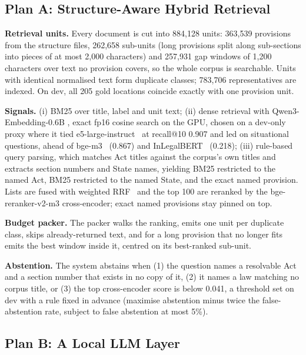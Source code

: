 \documentclass[conference]{IEEEtran}
\begin{document}
\subsection{Plan A: Structure-Aware Hybrid Retrieval}

\textbf{Retrieval units.} Every document is cut into 884,128 units: 363,539 provisions from the structure files,
262,658 sub-units (long provisions split along sub-sections into pieces of at most 2,000 characters) and 257,931
gap windows of 1,200 characters over text no provision covers, so the whole corpus is searchable. Units with
identical normalised text form duplicate classes; 783,706 representatives are indexed. On dev, all 205 gold
locations coincide exactly with one provision unit.

\textbf{Signals.} (i) BM25 over title, label and unit text; (ii) dense retrieval with Qwen3-Embedding-0.6B
\cite{zhang2025qwen3emb}, exact fp16 cosine search on the GPU, chosen on a dev-only proxy where it tied
e5-large-instruct~\cite{wang2024e5} at recall@10 0.907 and led on situational questions, ahead of
bge-m3~\cite{chen2024bgem3} (0.867) and InLegalBERT~\cite{paul2023inlegalbert} (0.218); (iii) rule-based query
parsing, which matches Act titles against the corpus's own titles and extracts section numbers and State names,
yielding BM25 restricted to the named Act, BM25 restricted to the named State, and the exact named provision.
Lists are fused with weighted RRF~\cite{cormack2009rrf} and the top 100 are reranked by the bge-reranker-v2-m3
cross-encoder; exact named provisions stay pinned on top.

\textbf{Budget packer.} The packer walks the ranking, emits one unit per duplicate class, skips already-returned
text, and for a long provision that no longer fits emits the best window inside it, centred on its best-ranked
sub-unit.

\textbf{Abstention.} The system abstains when (1) the question names a resolvable Act and a section number that
exists in no copy of it, (2) it names a law matching no corpus title, or (3) the top cross-encoder score is below
0.041, a threshold set on dev with a rule fixed in advance (maximise abstention minus twice the false-abstention
rate, subject to false abstention at most 5\%).

\subsection{Plan B: A Local LLM Layer}
\end{document}
